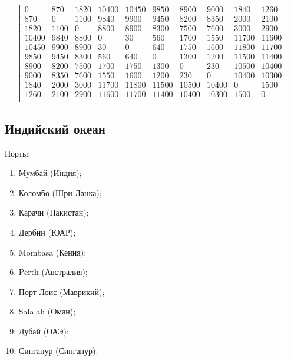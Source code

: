 \[
    \begin{bmatrix}
        0     & 870  & 1820 & 10400 & 10450 & 9850  & 8900  & 9000  & 1840  & 1260  \\
        870   & 0    & 1100 & 9840  & 9900  & 9450  & 8200  & 8350  & 2000  & 2100  \\
        1820  & 1100 & 0    & 8800  & 8900  & 8300  & 7500  & 7600  & 3000  & 2900  \\
        10400 & 9840 & 8800 & 0     & 30    & 560   & 1700  & 1550  & 11700 & 11600 \\
        10450 & 9900 & 8900 & 30    & 0     & 640   & 1750  & 1600  & 11800 & 11700 \\
        9850  & 9450 & 8300 & 560   & 640   & 0     & 1300  & 1200  & 11500 & 11400 \\
        8900  & 8200 & 7500 & 1700  & 1750  & 1300  & 0     & 230   & 10500 & 10400 \\
        9000  & 8350 & 7600 & 1550  & 1600  & 1200  & 230   & 0     & 10400 & 10300 \\
        1840  & 2000 & 3000 & 11700 & 11800 & 11500 & 10500 & 10400 & 0     & 1500  \\
        1260  & 2100 & 2900 & 11600 & 11700 & 11400 & 10400 & 10300 & 1500  & 0     \\
    \end{bmatrix}
\]

\subsection*{Индийский океан}
Порты:

\begin{enumerate}
    \item Мумбай (Индия);
    \item Коломбо (Шри-Ланка);
    \item Карачи (Пакистан);
    \item Дербин (ЮАР);
    \item Mombasa (Кения);
    \item Perth (Австралия);
    \item Порт Лоис (Маврикий);
    \item Salalah (Оман);
    \item Дубай (ОАЭ);
    \item Сингапур (Сингапур).
\end{enumerate}

